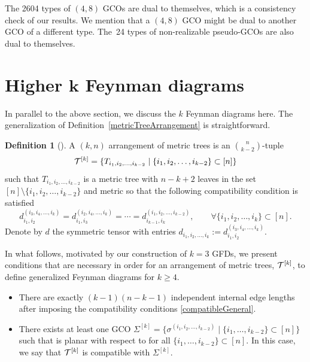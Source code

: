 \documentclass[pdftex]{sigma}
\theoremstyle{definition}
\newtheorem{defn}[thm]{Definition}
\def \be {\begin{equation}}
\def \ee {\end{equation}}
\def \be {\begin{equation}}
\numberwithin{equation}{section}
\begin{document}
The 2604 types of $(4,8)$ GCOs are dual to themselves, which is a consistency check of our results. We mention that a $(4,8)$ GCO might be dual to another GCO of a different type. The~24 types of non-realizable pseudo-GCOs are also dual to themselves.

\section[Higher k Feynman diagrams]{Higher $\boldsymbol{k}$ Feynman diagrams}\label{sechigherkGFD}

In parallel to the above section, we discuss the $k$ Feynman diagrams here.
The generalization of Definition~\ref{metricTreeArrangement} is straightforward.

\begin{defn}[\cite{herrmann2008draw}]\label{metricTreeArrangementg}
A $(k,n)$ arrangement of metric trees is an ${n \choose k-2}$-tuple
\begin{align*}%
 {\cal T}^{[k]} = \{T_{i_1,i_2,\dots,i_{k-2}}\mid \{i_1,i_2,\dots,i_{k-2} \} \subset [n]\}
\end{align*}
 such that $T_{i_1,i_2,\dots,i_{k-2}}$ is a metric tree with $n-k+2$ leaves in the set $[n]\setminus \{i_1,i_2,\dots,i_{k-2} \} $ and metric  so that the following compatibility condition is satisfied
%
\be\label{compatibleGeneral}
d^{(i_3,i_4,\dots,i_k)}_{i_1,i_2} = d^{(i_2,i_4,\dots,i_k)}_{i_1,i_3} =\cdots =d^{(i_1,i_2,\dots,i_{k-2})}_{i_{k-1},i_k} , \qquad \forall \{i_1,i_2,\dots,i_k\}\subset [n].
\ee
Denote by $d$ the symmetric tensor with entries $d_{i_1,i_2,\dots,i_k}:=d^{(i_3,i_4,\dots,i_k)}_{i_1,i_2}$.
\end{defn}

In what follows, motivated by our construction of $k=3$ GFDs, we present conditions that are necessary in order for an arrangement of metric trees, ${\cal T}^{[k]}$, to define generalized Feynman diagrams for $k\ge 4$.
\begin{itemize}\itemsep=0pt
 \item There are exactly $(k-1)(n-k-1)$ independent internal edge lengths after imposing the compatibility conditions \eqref{compatibleGeneral}.
 \item There exists at least one GCO $\Sigma^{[k]} = \big\{ \sigma^{(i_1,i_2,\dots,i_{k-2})}\mid \{i_1,\dots, i_{k-2}\} \subset [n] \big\}$ such that  is planar with respect to  for all $\{i_1,\dots, i_{k-2}\} \subset [n]$. In this case, we say that ${\cal T}^{[k]}$ is compatible with $\Sigma^{[k]}$.
\end{itemize}
\end{document}
